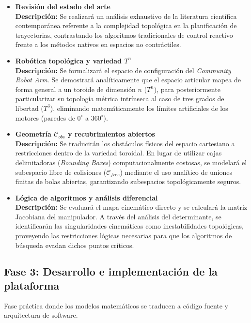 \begin{itemize}
    \item \textbf{Revisión del estado del arte} \\
    \textbf{Descripción:} Se realizará un análisis exhaustivo de la literatura científica contemporánea referente a la complejidad topológica en la planificación de trayectorias, contrastando los algoritmos tradicionales de control reactivo frente a los métodos nativos en espacios no contráctiles.

    \item \textbf{Robótica topológica y variedad $T^n$} \\
    \textbf{Descripción:} Se formalizará el espacio de configuración del \textit{Community Robot Arm}. Se demostrará analíticamente que el espacio articular mapea de forma general a un toroide de dimensión $n$ ($T^n$), para posteriormente particularizar su topología métrica intrínseca al caso de tres grados de libertad ($T^3$), eliminando matemáticamente los límites artificiales de los motores (paredes de $0^\circ$ a $360^\circ$).

    \item \textbf{Geometría $\mathcal{C}_{obs}$ y recubrimientos abiertos} \\
    \textbf{Descripción:} Se traducirán los obstáculos físicos del espacio cartesiano a restricciones dentro de la variedad toroidal. En lugar de utilizar cajas delimitadoras (\textit{Bounding Boxes}) computacionalmente costosas, se modelará el subespacio libre de colisiones ($\mathcal{C}_{free}$) mediante el uso analítico de uniones finitas de bolas abiertas, garantizando subespacios topológicamente seguros.

    \item \textbf{Lógica de algoritmos y análisis diferencial} \\
    \textbf{Descripción:} Se evaluará el mapa cinemático directo y se calculará la matriz Jacobiana del manipulador. A través del análisis del determinante, se identificarán las singularidades cinemáticas como inestabilidades topológicas, proveyendo las restricciones lógicas necesarias para que los algoritmos de búsqueda evadan dichos puntos críticos.
\end{itemize}

\subsection*{Fase 3: Desarrollo e implementación de la plataforma}
Fase práctica donde los modelos matemáticos se traducen a código fuente y arquitectura de software.


